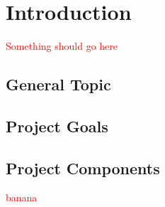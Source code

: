 

\section{Introduction}

\textcolor{red}{Something should go here}


\subsection{General Topic}



\subsection{Project Goals}



\subsection{Project Components}

\textcolor{red}{banana}